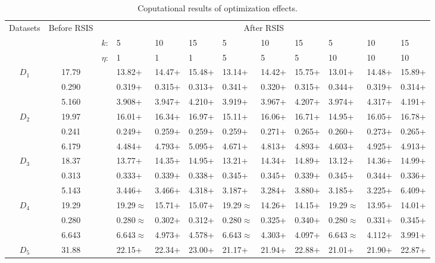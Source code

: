 \documentclass[final,3p,times]{elsarticle}
\begin{document}
\begin{table}[t!]
  \caption{Coputational results of optimization effects.}\label{tab3}
  \begin{tabularx}{\textwidth}{cccXXXXXXXXX}
  \toprule
  \multirow{3}{*}{Datasets} & \multirow{3}{*}{Before RSIS} & \multicolumn{10}{c}{After RSIS} \\ 
  \cmidrule{3-12}
    &  & $k$: & 5 & 10 & 15 & 5 & 10 & 15 & 5 & 10 & 15 \\ 
    &  & $\eta$: & 1 & 1 & 1 & 5 & 5 & 5 & 10 & 10 & 10 \\
  \hline
  \multirow{3}{*}{$D_1$} & 17.79 &  & 13.82+ & 14.47+ & 15.48+ & 13.14+ & 14.42+ & 15.75+ & 13.01+ & 14.48+ & 15.89+ \\
    & 0.290 &  & 0.319+ & 0.315+ & 0.313+ & 0.341+ & 0.320+ & 0.315+ & 0.344+ & 0.319+ & 0.314+ \\
    & 5.160 &  & 3.908+ & 3.947+ & 4.210+ & 3.919+ & 3.967+ & 4.207+ & 3.974+ & 4.317+ & 4.191+ \\
  \hline
  \multirow{3}{*}{$D_2$} & 19.97 &  & 16.01+ & 16.34+ & 16.97+ & 15.11+ & 16.06+ & 16.71+ & 14.95+ & 16.05+ & 16.78+ \\
    & 0.241 &  & 0.249+ & 0.259+ & 0.259+ & 0.259+ & 0.271+ & 0.265+ & 0.260+ & 0.273+ & 0.265+ \\
    & 6.179 &  & 4.484+ & 4.793+ & 5.095+ & 4.671+ & 4.813+ & 4.893+ & 4.603+ & 4.925+ & 4.913+ \\
  \hline
  \multirow{3}{*}{$D_3$} & 18.37 &  & 13.77+ & 14.35+ & 14.95+ & 13.21+ & 14.34+ & 14.89+ & 13.12+ & 14.36+ & 14.99+ \\
    & 0.313 &  & 0.333+ & 0.339+ & 0.338+ & 0.345+ & 0.345+ & 0.339+ & 0.345+ & 0.344+ & 0.336+ \\
    & 5.143 &  & 3.446+ & 3.466+ & 4.318+ & 3.187+ & 3.284+ & 3.880+ & 3.185+ & 3.225+ & 6.409+ \\
  \hline
  \multirow{3}{*}{$D_4$} & 19.29 &  & 19.29$\approx$ & 15.71+ & 15.07+ & 19.29$\approx$ & 14.26+ & 14.15+ & 19.29$\approx$ & 13.95+ & 14.01+ \\
    & 0.280 &  & 0.280$\approx$ & 0.302+ & 0.312+ & 0.280$\approx$ & 0.325+ & 0.340+ & 0.280$\approx$ & 0.331+ & 0.345+ \\
    & 6.643 &  & 6.643$\approx$ & 4.973+ & 4.578+ & 6.643$\approx$ & 4.303+ & 4.097+ & 6.643$\approx$ & 4.112+ & 3.991+ \\
  \hline
  \multirow{3}{*}{$D_5$} & 31.88 &  & 22.15+ & 22.34+ & 23.00+ & 21.17+ & 21.94+ & 22.88+ & 21.01+ & 21.90+ & 22.87+ \\

\end{tabularx}
\end{table}
\end{document}
